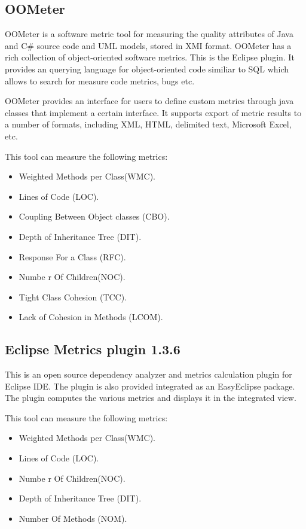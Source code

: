 \subsection{OOMeter}

OOMeter is a software metric tool for measuring the quality attributes of Java and C\# source code and UML models, stored in XMI format. OOMeter has a rich collection of object-oriented software metrics. This is the Eclipse plugin. It provides an querying language for object-oriented code similiar to SQL which
allows to search for measure code metrics, bugs etc.

OOMeter provides an interface for users to define custom metrics through java classes that implement a certain interface. It supports export of metric results to a number of formats, including XML, HTML, delimited text, Microsoft Excel, etc.

This tool can measure the following metrics:

\begin{itemize}
	\item Weighted Methods per Class(WMC).
	\item Lines of Code (LOC). 
	\item Coupling Between Object classes (CBO).
	\item Depth of Inheritance Tree (DIT).
	\item Response For a Class (RFC).
	\item Numbe r Of Children(NOC).
	\item Tight Class Cohesion (TCC).
	\item Lack of Cohesion in Methods (LCOM).
\end{itemize}



\subsection{Eclipse Metrics plugin 1.3.6}

This is an open source dependency analyzer and metrics calculation plugin for Eclipse IDE. The plugin is also provided 
integrated  as  an  EasyEclipse  package.  The  plugin computes   the  various metrics and displays it in the integrated view.


This tool can measure the following metrics:

\begin{itemize}
	\item Weighted Methods per Class(WMC).
	\item Lines of Code (LOC). 
	\item Numbe r Of Children(NOC).
	\item Depth of Inheritance Tree (DIT).
    \item Number Of Methods (NOM).
\end{itemize}


